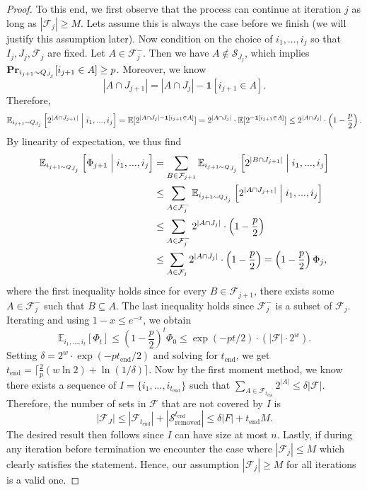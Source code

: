 \documentclass{article}
\renewcommand{\Pr}{\mathop{\bf Pr\/}}
\newcommand{\<}{\langle}
\renewcommand{\>}{\rangle}
\newcommand{\calF}{\mathcal{F}}
\newcommand{\calS}{\mathcal{S}}
\newcommand{\E}{\mathbb{E}}
\begin{document}
\begin{proof}
    To this end, we first observe that the process can continue at iteration $j$ as long as $|\calF_j| \geq M$. Lets assume this is always the case before we finish (we will justify this assumption later).   Now condition on the choice of $i_1,\ldots,i_j$ so that $I_j, J_j, \calF_j$ are fixed. Let $A \in \calF_{j}^{-}$. Then we have $A \notin \calS_{J_j}$, which implies  $\Pr_{i_{j+1} \sim Q_{J_j}}[i_{j+1} \in A] \geq p$. Moreover, we know
    \[
    |A \cap J_{j+1}| = |A \cap J_{j}| - \mathbf{1}[i_{j+1} \in A].
    \]
    Therefore,
    \[
    \E_{i_{j+1} \sim Q_{J_j}} \left[2^{|A \cap J_{j+1}|}\Bigm| i_1,...,i_j \right] = \E[2^{|A \cap J_{j}| - \mathbf{1}[i_{j+1} \in A]}] = 2^{|A \cap J_{j}|} \cdot \E [2^{- \mathbf{1}[i_{j+1} \in A]}] \leq 2^{|A \cap J_{j}|} \cdot \left(1 - \frac{p}{2} \right).
    \]
    By linearity of expectation, we thus find
    \[
    \begin{split}
        \E_{i_{j+1 \sim Q_{J_j}}}\left[ \Phi_{j+1} \Bigm| i_1,...,i_j\right] &= \sum_{B \in \calF_{j+1}} \E_{i_{j+1 \sim Q_{J_j}}}\left[ 2^{|B \cap J_{j+1}|} \Bigm| i_1,...,i_j\right] \\
        &\leq  \sum_{A\in \calF_{j}^-} \E_{i_{j+1 \sim Q_{J_j}}}\left[ 2^{|A \cap J_{j+1}|} \Bigm| i_1,...,i_j\right] \\
        &\leq \sum_{A \in \calF_{j}^-}2^{|A \cap J_{j}|} \cdot \left(1 - \frac{p}{2} \right) \\
        &\leq \sum_{A \in \calF_j}2^{|A \cap J_j|} \cdot \left(1 - \frac{p}{2} \right) = \left(1 - \frac{p}{2} \right) \Phi_j,
    \end{split}
    \]
    where the first inequality holds since for every $B \in \calF_{j+1}$, there exists some $A \in \calF_{j}^-$ such that $B \subseteq A$. The last inequality holds since $\calF_{j}^-$ is a subset of $\calF_j$. Iterating and using $1-x \leq e^{-x}$, we obtain
    \[
    \E_{i_1,...,i_t} [\Phi_t] \leq \left(1 - \frac{p}{2} \right)^t \Phi_0 \leq \exp (-pt/2) \cdot (|\calF| \cdot 2^w).
    \]
    Setting $\delta = 2^w \cdot \exp (-pt_{\text{end}}/2)$ and solving for $t_{\text{end}}$, we get $t_{\text{end}} = \lceil \frac{2}{p}(w \ln 2) + \ln (1/\delta) \rceil$. Now by the first moment method, we know there exists a sequence of $I = \{i_1,...,i_{t_{\text{end}}}\}$ such that $\sum_{A \in \calF_{t_{\text{end}}}}2^{|A|} \leq \delta |\calF|$. Therefore, the number of sets in $\calF$ that are not covered by $I$ is
    \[
    |\calF_J| \leq |\calF_{t_{\text{end}}}| + |\calS_{\text{removed}}^{t_{\text{end}}}| \leq \delta |F| + t_{\text{end}}M.
    \]
    The desired result then follows since $I$ can have size at most $n$. Lastly, if during any iteration before termination we encounter the case where $|\calF_j| \leq M$ which clearly satisfies the statement. Hence, our assumption $|\calF_j| \geq M$ for all iterations is a valid one.    
\end{proof}
\end{document}
